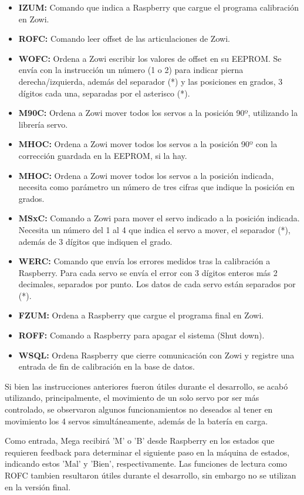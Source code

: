 \begin{itemize}
  \item \textbf{IZUM:} Comando que indica a Raspberry que cargue el programa calibración en Zowi.
  \item \textbf{ROFC:} Comando leer offset de las articulaciones de Zowi.
  \item \textbf{WOFC:} Ordena a Zowi escribir los valores de offset en su EEPROM. Se envía con la instrucción un número (1 o 2) para indicar pierna derecha/izquierda, además del separador (*) y las posiciones en grados, 3 dígitos cada una, separadas por el asterisco (*).
  \item \textbf{M90C:} Ordena a Zowi mover todos los servos a la posición 90º, utilizando la librería servo.
  \item \textbf{MHOC:} Ordena a Zowi mover todos los servos a la posición 90º con la corrección guardada en la EEPROM, si la hay.
  \item \textbf{MHOC:} Ordena a Zowi mover todos los servos a la posición indicada, necesita como parámetro un número de tres cifras que indique la posición en grados.
  \item \textbf{MSxC:} Comando a Zowi para mover el servo indicado a la posición indicada. Necesita un número del 1 al 4 que indica el servo a mover, el separador (*), además de 3 dígitos que indiquen el grado.
  \item \textbf{WERC:} Comando que envía los errores medidos tras la calibración a Raspberry. Para cada servo se envía el error con 3 dígitos enteros más 2 decimales, separados por punto. Los datos de cada servo están separados por (*).
  \item \textbf{FZUM:} Ordena a Raspberry que cargue el programa final en Zowi.
  \item \textbf{ROFF:} Comando a Raspberry para apagar el sistema (Shut down).
  \item \textbf{WSQL:} Ordena Raspberry que cierre comunicación con Zowi y registre una entrada de fin de calibración en la base de datos.
\end{itemize}

Si bien las instrucciones anteriores fueron útiles durante el desarrollo, se acabó utilizando, principalmente, el movimiento de un solo servo por ser más controlado, se observaron algunos funcionamientos no deseados al tener en movimiento los 4 servos simultáneamente, además de la batería en carga.

Como entrada, Mega recibirá 'M' o 'B' desde Raspberry en los estados que requieren feedback para determinar el siguiente paso en la máquina de estados, indicando estos 'Mal' y 'Bien', respectivamente. Las funciones de lectura como ROFC tambien resultaron útiles durante el desarrollo, sin embargo no se utilizan en la versión final.

